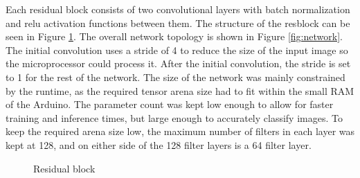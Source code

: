 \documentclass{article}
\begin{document}
Each residual block consists of two convolutional layers
with batch normalization and relu activation functions
between them. The structure of the resblock can be seen in
Figure \ref{fig:resblock}. The overall network
topology is shown in Figure \ref{fig:network}. The initial
convolution uses a stride of 4 to reduce the size of the
input image so the microprocessor could process it. After
the initial convolution, the stride is set to 1 for the rest
of the network. The size of the network was mainly
constrained by the runtime, as the required tensor arena
size had to fit within the small RAM of the Arduino. The
parameter count was kept low enough to allow for faster
training and inference times, but large enough to accurately
classify images. To keep the required arena size low, the
maximum number of filters in each layer was kept at 128, and
on either side of the 128 filter layers is a 64 filter
layer.


\begin{figure}[ht]
\begin{center}
    \caption{Residual block}
    \label{fig:resblock}
\end{center}
\end{figure}
\end{document}
